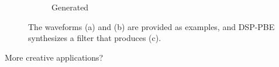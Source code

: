 \begin{figure}
\begin{subfigure}{.32\linewidth}
  \caption{Generated}
  \label{fig:synthEx}
\end{subfigure}
\caption{The waveforms (a) and (b) are provided as examples, and DSP-PBE synthesizes a filter that produces (c).}
\label{fig:test}
\end{figure}

More creative applications?
